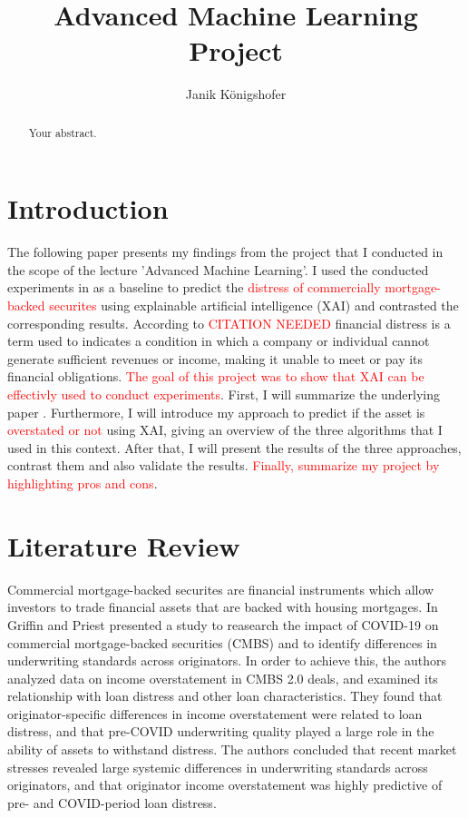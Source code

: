 \documentclass{article}
\title{Advanced Machine Learning Project}
\author{Janik Königshofer}
\begin{document}
\maketitle

\begin{abstract}
Your abstract.
\end{abstract}

\section{Introduction}
The following paper presents my findings from the project that I conducted in the scope of the lecture 'Advanced Machine Learning'.
I used the conducted experiments in \cite{CMBS-Paper} as a baseline to predict the \textcolor{red}{distress of commercially mortgage-backed securites} using explainable artificial intelligence (XAI) and contrasted the corresponding results.
According to \textcolor{red}{CITATION NEEDED} financial distress is a term used to indicates a condition in which a company or individual cannot generate sufficient revenues or income, making it unable to meet or pay its financial obligations. 
\textcolor{red}{The goal of this project was to show that XAI can be effectivly used to conduct experiments}.
First, I will summarize the underlying paper \cite{CMBS-Paper}. Furthermore, I will introduce my approach to predict if the asset is \textcolor{red}{overstated or not} using XAI, giving an overview of the three algorithms that I used in this context. After that, I will present the results of the three approaches, contrast them and also validate the results.
\textcolor{red}{Finally, summarize my project by highlighting pros and cons}.

\section{Literature Review}
Commercial mortgage-backed securites are financial instruments which allow investors to trade financial assets that are backed with housing mortgages. 
In \cite{CMBS-Paper} Griffin and Priest presented a study to reasearch the impact of COVID-19 on commercial mortgage-backed securities (CMBS) and to identify differences in underwriting standards across originators.
In order to achieve this, the authors analyzed data on income overstatement in CMBS 2.0 deals, and examined its relationship with loan distress and other loan characteristics.
They found that originator-specific differences in income overstatement were related to loan distress, and that pre-COVID underwriting quality played a large role in the ability of assets to withstand distress. The authors concluded that recent market stresses revealed large systemic differences in underwriting standards across originators, and that originator income overstatement was highly predictive of pre- and COVID-period loan distress.
\end{document}
